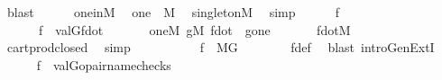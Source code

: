 \begin{isabellebody}
\ blast\isanewline
\ \ \ \ \isamarkupfalse%
\ one{\isacharunderscore}{\kern0pt}in{\isacharunderscore}{\kern0pt}M\ \isamarkupfalse%
\ {\isachardoublequoteopen}{\isacharbraceleft}{\kern0pt}one{\isacharbraceright}{\kern0pt}\ {\isasymin}\ M{\isachardoublequoteclose}\ \isamarkupfalse%
\ singletonM\ \isamarkupfalse%
\ simp\isanewline
\ \ \ \ \isamarkupfalse%
\ f\ \isanewline
\ \ \ \ \ \ {\isachardoublequoteopen}f\ {\isasymequiv}\ val{\isacharparenleft}{\kern0pt}G{\isacharcomma}{\kern0pt}{\isacharquery}{\kern0pt}f{\isacharunderscore}{\kern0pt}dot{\isacharparenright}{\kern0pt}{\isachardoublequoteclose}\ \isanewline
\ \ \ \ \isamarkupfalse%
\ {\isacartoucheopen}{\isacharbraceleft}{\kern0pt}one{\isacharbraceright}{\kern0pt}{\isasymin}M{\isacartoucheclose}\ {\isacartoucheopen}{\isacharquery}{\kern0pt}g{\isasymin}M{\isacartoucheclose}\ {\isacartoucheopen}{\isacharquery}{\kern0pt}f{\isacharunderscore}{\kern0pt}dot\ {\isacharequal}{\kern0pt}\ {\isacharquery}{\kern0pt}g{\isasymtimes}{\isacharbraceleft}{\kern0pt}one{\isacharbraceright}{\kern0pt}{\isacartoucheclose}\ \isanewline
\ \ \ \ \isamarkupfalse%
\ {\isachardoublequoteopen}{\isacharquery}{\kern0pt}f{\isacharunderscore}{\kern0pt}dot{\isasymin}M{\isachardoublequoteclose}\ \isanewline
\ \ \ \ \ \ \isamarkupfalse%
\ cartprod{\isacharunderscore}{\kern0pt}closed\ \isamarkupfalse%
\ simp\isanewline
\ \ \ \ \isamarkupfalse%
\isanewline
\ \ \ \ \isamarkupfalse%
\ {\isachardoublequoteopen}f\ {\isasymin}\ M{\isacharbrackleft}{\kern0pt}G{\isacharbrackright}{\kern0pt}{\isachardoublequoteclose}\isanewline
\ \ \ \ \ \ \isamarkupfalse%
\ f{\isacharunderscore}{\kern0pt}def\ \isamarkupfalse%
\ {\isacharparenleft}{\kern0pt}blast\ intro{\isacharcolon}{\kern0pt}GenExtI{\isacharparenright}{\kern0pt}\isanewline
\ \ \ \ \isamarkupfalse%
\ {\isachardoublequoteopen}f\ {\isacharequal}{\kern0pt}\ {\isacharbraceleft}{\kern0pt}val{\isacharparenleft}{\kern0pt}G{\isacharcomma}{\kern0pt}opair{\isacharunderscore}{\kern0pt}name{\isacharparenleft}{\kern0pt}check{\isacharparenleft}{\kern0pt}{\isasymbeta}{\isacharparenright}{\kern0pt}{\isacharcomma}{\kern0pt}s{\isacharbackquote}{\kern0pt}{\isasymbeta}{\isacharparenright}{\kern0pt}{\isacharparenright}{\kern0pt}\ {\isachardot}{\kern0pt}\ {\isasymbeta}{\isasymin}{\isasymalpha}{\isacharbraceright}{\kern0pt}{\isachardoublequoteclose}\isanewline
\ \ \ \ \ \ \isamarkupfalse%

\end{isabellebody}
